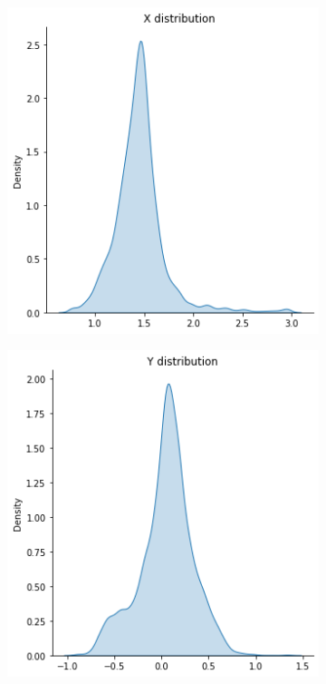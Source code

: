 \begin{figure}[!h]
	\begin{center}
		\begin{subfigure}[h]{0.24\textwidth}
			\centering
			\includegraphics[width=1\textwidth]{"contents/images/distributions/x-regr"}
		\end{subfigure}
		\hfill
		\begin{subfigure}[h]{0.24\textwidth}
			\centering
			\includegraphics[width=1\textwidth]{"contents/images/distributions/y-regr"}

\end{subfigure}
\end{center}
\end{figure}
